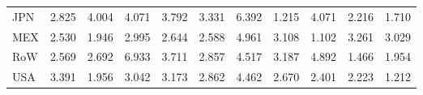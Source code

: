 \begin{table}[htbp]
\begin{tabular}{lcccccccccc}
  JPN & \textcolor[RGB]{143,92,112}{2.825} & \textcolor[RGB]{69,45,186}{4.004} & \textcolor[RGB]{66,43,189}{4.071} & \textcolor[RGB]{74,48,181}{3.792} & \textcolor[RGB]{94,61,161}{3.331} & \textcolor[RGB]{25,16,230}{6.392} & \textcolor[RGB]{237,153,18}{1.215} & \textcolor[RGB]{64,41,191}{4.071} & \textcolor[RGB]{196,127,59}{2.216} & \textcolor[RGB]{222,144,33}{1.710} \\ 
  MEX & \textcolor[RGB]{176,114,79}{2.530} & \textcolor[RGB]{212,137,43}{1.946} & \textcolor[RGB]{130,84,125}{2.995} & \textcolor[RGB]{163,106,92}{2.644} & \textcolor[RGB]{171,111,84}{2.588} & \textcolor[RGB]{38,25,217}{4.961} & \textcolor[RGB]{115,74,140}{3.108} & \textcolor[RGB]{247,160,8}{1.102} & \textcolor[RGB]{105,68,150}{3.261} & \textcolor[RGB]{125,81,130}{3.029} \\ 
  RoW & \textcolor[RGB]{173,112,82}{2.569} & \textcolor[RGB]{156,101,99}{2.692} & \textcolor[RGB]{23,15,232}{6.933} & \textcolor[RGB]{79,51,176}{3.711} & \textcolor[RGB]{138,89,117}{2.857} & \textcolor[RGB]{48,31,207}{4.517} & \textcolor[RGB]{110,71,145}{3.187} & \textcolor[RGB]{41,26,214}{4.892} & \textcolor[RGB]{230,148,26}{1.466} & \textcolor[RGB]{209,135,46}{1.954} \\ 
  USA & \textcolor[RGB]{87,56,168}{3.391} & \textcolor[RGB]{207,134,48}{1.956} & \textcolor[RGB]{122,79,133}{3.042} & \textcolor[RGB]{112,73,143}{3.173} & \textcolor[RGB]{135,87,120}{2.862} & \textcolor[RGB]{51,33,204}{4.462} & \textcolor[RGB]{161,104,94}{2.670} & \textcolor[RGB]{186,120,69}{2.401} & \textcolor[RGB]{194,125,61}{2.223} & \textcolor[RGB]{240,155,15}{1.212} \\ 
   \hline
\end{tabular}
\end{table}
